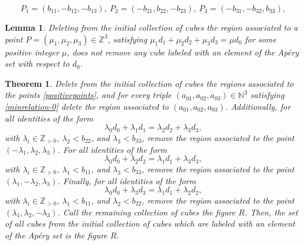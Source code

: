 \documentclass[10pt,a4paper]{amsart}
\newtheorem{lemma}{Lemma}
\newtheorem{thm}{Theorem}
\begin{document}
\begin{equation}\label{positivepoints}
 P_1=(b_{11},-b_{12},-b_{13}), \ P_2=(-b_{21},b_{22},-b_{23}), \ P_3 = (-b_{31}, -b_{32}, b_{33}),
\end{equation} 

\begin{lemma}\label{1remlemma}
    Deleting from the initial collection of cubes the region associated to a point $P = (\mu_1,\mu_2,\mu_3) \in \mathbb{Z}^3$, satisfying $\mu_1d_1 + \mu_2d_2 + \mu_3d_3 = \mu d_0$ for some positive integer $\mu$, does not remove any cube labeled with an element of the Ap{\'e}ry set with respect to $d_0$. 
\end{lemma}

\begin{thm}\label{theoremprocedure}
     Delete from the initial collection of cubes the regions associated to the points \eqref{positivepoints}, and for every triple $(a_{01},a_{02},a_{03}) \in \mathbb{N}^3$ satisfying \eqref{minrelation-0} delete the region associated to $(a_{01},a_{02},a_{03})$. Additionally, for all identities of the form
    $$ \lambda_0d_0 + \lambda_1d_1=\lambda_2d_2 + \lambda_3d_3,  $$
    with $\lambda_i \in \mathbb{Z}_{>0}$, $\lambda_2 < b_{22}$, and $\lambda_3 < b_{33}$, remove the region associated to the point $(-\lambda_1,\lambda_2,\lambda_3)$. For all identities of the form
    $$ \lambda_0d_0 + \lambda_2d_2=\lambda_1d_1 + \lambda_3d_3,  $$
    with $\lambda_i \in \mathbb{Z}_{>0}$, $\lambda_1 < b_{11}$, and $\lambda_3 < b_{33}$, remove the region associated to the point $(\lambda_1,-\lambda_2,\lambda_3)$. Finally, for all identities of the form
    $$ \lambda_0d_0 + \lambda_3d_3=\lambda_1d_1 + \lambda_2d_2,  $$
    with $\lambda_i \in \mathbb{Z}_{>0}$, $\lambda_1 < b_{11}$, and $\lambda_2 < b_{22}$, remove the region associated to the point $(\lambda_1,\lambda_2,-\lambda_3)$.
    Call the remaining collection of cubes the figure $R$. Then, the set of all cubes from the initial collection of cubes which are labeled with an element of the Ap{\'e}ry set is the figure $R$.
\end{thm}
\end{document}

